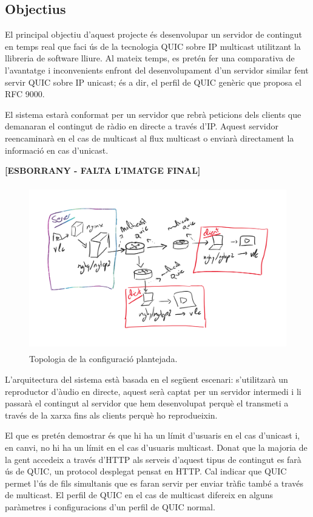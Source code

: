 \subsection{Objectius}
{
    El principal objectiu d'aquest projecte és desenvolupar un servidor de contingut en temps real que faci ús de la tecnologia
    QUIC sobre \ac{IP} multicast utilitzant la llibreria de software lliure. Al mateix temps, es pretén fer una comparativa de l'avantatge i inconvenients enfront del desenvolupament d'un servidor similar fent servir QUIC sobre IP unicast; és a dir, el perfil
    de QUIC genèric que proposa el \ac{RFC} 9000.

    El sistema estarà conformat per un servidor que rebrà peticions dels clients que demanaran el contingut de ràdio en directe a
    través d'\ac{IP}. Aquest servidor reencaminarà en el cas de multicast al flux multicast o enviarà directament la informació en
    cas d'unicast.

    \textbf{[ESBORRANY - FALTA L'IMATGE FINAL]}
    \begin{figure}[H]
        \label{fig:esborrany_configuracio}
        \centering
        \includegraphics[width=15cm, height=7.2cm]{img/01_introduccio/topologia_conf.png}
        \caption[Trafic d'Internet]{\footnotesize{Topologia de la configuració plantejada.}}
    \end{figure}

    L'arquitectura del sistema està basada en el següent escenari: s'utilitzarà un reproductor d'àudio en directe, aquest serà captat
    per un servidor intermedi i li passarà el contingut al servidor que hem desenvolupat perquè el transmeti a través de la xarxa fins als
    clients perquè ho reprodueixin.
    
    El que es pretén demostrar és que hi ha un límit d'usuaris en el cas d'unicast i, en canvi, no hi ha un límit en el cas d'usuaris multicast.
    Donat que la majoria de la gent accedeix a través d'HTTP als serveis d'aquest tipus de contingut es farà ús de QUIC, un protocol desplegat
    pensat en HTTP. Cal indicar que QUIC permet l'ús de fils simultanis que es faran servir per enviar tràfic també a través de multicast. El perfil
    de QUIC en el cas de multicast difereix en alguns paràmetres i configuracions d'un perfil de QUIC normal.
}

